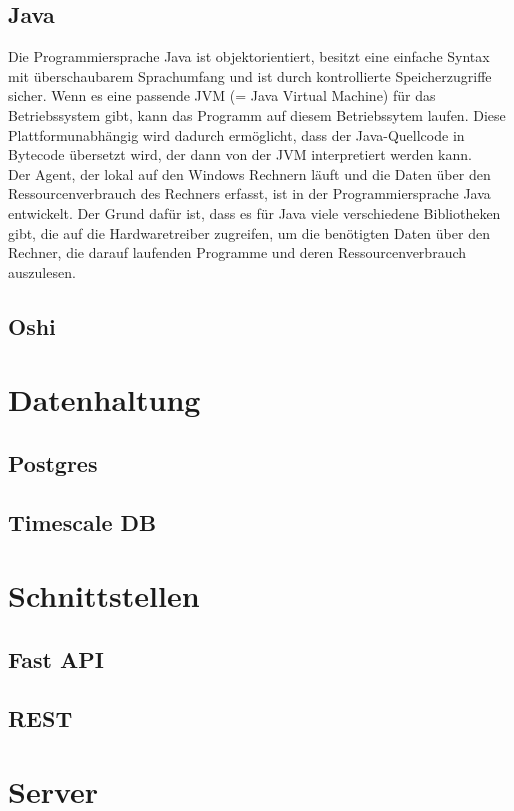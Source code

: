 \documentclass{report}
\begin{document}
\subsection{Java}
Die Programmiersprache Java ist objektorientiert, besitzt eine einfache Syntax mit überschaubarem Sprachumfang und ist durch kontrollierte Speicherzugriffe sicher. Wenn es eine passende JVM (= Java Virtual Machine) für das Betriebssystem gibt, kann das Programm auf diesem Betriebssytem laufen. Diese Plattformunabhängig wird dadurch ermöglicht, dass der Java-Quellcode in Bytecode übersetzt wird, der dann von der JVM interpretiert werden kann.\\
Der Agent, der lokal auf den Windows Rechnern läuft und die Daten über den Ressourcenverbrauch des Rechners erfasst, ist in der Programmiersprache Java entwickelt. Der Grund dafür ist, dass es für Java viele verschiedene Bibliotheken gibt, die auf die Hardwaretreiber zugreifen, um die benötigten Daten über den Rechner, die darauf laufenden Programme und deren Ressourcenverbrauch auszulesen.

\subsection{Oshi}

\section{Datenhaltung}
\subsection{Postgres}
\subsection{Timescale DB}

\section{Schnittstellen}
\subsection{Fast API}
\subsection{REST}

\section{Server}
\end{document}
